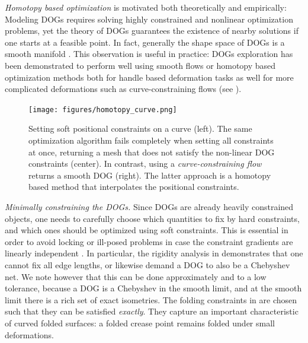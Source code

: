 \emph{Homotopy based optimization} is motivated both theoretically and empirically: Modeling DOGs requires solving highly constrained and nonlinear optimization problems, yet the theory of DOGs guarantees the existence of nearby solutions if one starts at a feasible point. In fact, generally the shape space of DOGs is a smooth manifold \cite{rabi2018shape}. This observation is useful in practice: DOGs exploration has been demonstrated to perform well using smooth flows or homotopy based optimization methods both for handle based deformation tasks as well for more complicated deformations such as curve-constraining flows \cite{rabi2018shape} (see ).
\begin{figure} [h]
	\centering
	\texttt{[image: figures/homotopy\_curve.png]}
	\caption{Setting soft positional constraints on a curve (left). The same optimization algorithm fails completely when setting all constraints at once, returning a mesh that does not satisfy the non-linear DOG constraints (center). In contrast, using a \emph{curve-constraining flow} \cite{rabi2018shape} returns a smooth DOG (right). The latter approach is a homotopy based method that interpolates the positional constraints.} 
	\label{fig:homotopy_curve}
\end{figure}

\emph{Minimally constraining the DOGs.} Since DOGs are already heavily constrained objects, one needs to carefully choose which quantities to fix by hard constraints, and which ones should be optimized using soft constraints. This is essential in order to avoid locking or ill-posed problems in case the constraint gradients are linearly independent \cite{rabi2018shape}. In particular, the rigidity analysis in \cite{rabi18} demonstrates that one cannot fix all edge lengths, or likewise demand a DOG to also be a Chebyshev net. We note however that this can be done approximately and to a low tolerance, because a DOG is a Chebyshev in the smooth limit, and at the smooth limit there is a rich set of exact isometries. The folding constraints in  are chosen such that they can be satisfied \emph{exactly}. They capture an important characteristic of curved folded surfaces: a folded crease point remains folded under small deformations.
